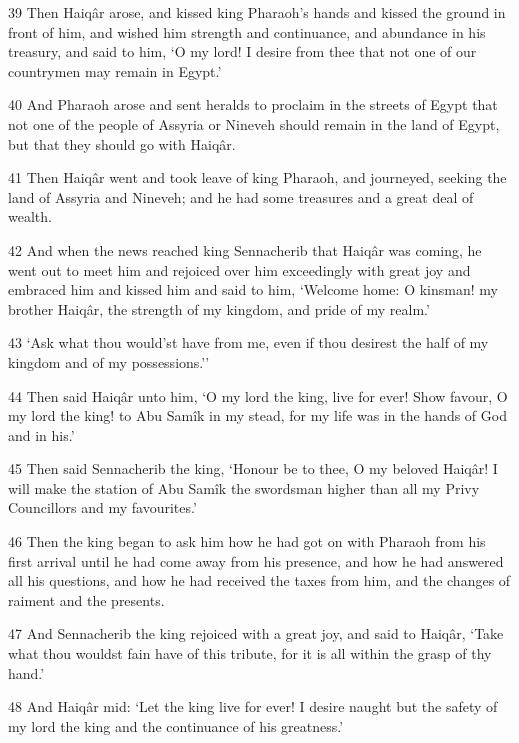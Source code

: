 \par 39 Then Haiqâr arose, and kissed king Pharaoh's hands and kissed the ground in front of him, and wished him strength and continuance, and abundance in his treasury, and said to him, ‘O my lord! I desire from thee that not one of our countrymen may remain in Egypt.’

\par 40 And Pharaoh arose and sent heralds to proclaim in the streets of Egypt that not one of the people of Assyria or Nineveh should remain in the land of Egypt, but that they should go with Haiqâr.

\par 41 Then Haiqâr went and took leave of king Pharaoh, and journeyed, seeking the land of Assyria and Nineveh; and he had some treasures and a great deal of wealth.

\par 42 And when the news reached king Sennacherib that Haiqâr was coming, he went out to meet him and rejoiced over him exceedingly with great joy and embraced him and kissed him and said to him, ‘Welcome home: O kinsman! my brother Haiqâr, the strength of my kingdom, and pride of my realm.’

\par 43 ‘Ask what thou would'st have from me, even if thou desirest the half of my kingdom and of my possessions.’'

\par 44 Then said Haiqâr unto him, ‘O my lord the king, live for ever! Show favour, O my lord the king! to Abu Samîk in my stead, for my life was in the hands of God and in his.’

\par 45 Then said Sennacherib the king, ‘Honour be to thee, O my beloved Haiqâr! I will make the station of Abu Samîk the swordsman higher than all my Privy Councillors and my favourites.’

\par 46 Then the king began to ask him how he had got on with Pharaoh from his first arrival until he had come away from his presence, and how he had answered all his questions, and how he had received the taxes from him, and the changes of raiment and the presents.

\par 47 And Sennacherib the king rejoiced with a great joy, and said to Haiqâr, ‘Take what thou wouldst fain have of this tribute, for it is all within the grasp of thy hand.’

\par 48 And Haiqâr mid: ‘Let the king live for ever! I desire naught but the safety of my lord the king and the continuance of his greatness.’

